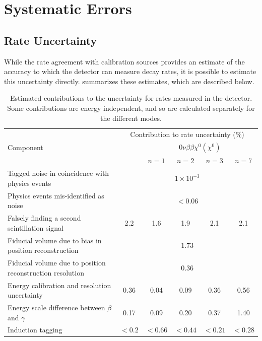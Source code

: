 \documentclass[herrin-thesis.tex]{subfiles}
\begin{document}
\section{Systematic Errors}
\subsection{Rate Uncertainty}
\label{sec:analysis_rate_uncertainty}
While the rate agreement with calibration sources provides an estimate of the accuracy to which the detector can measure decay rates, it is possible to estimate this uncertainty directly.  summarizes these estimates, which are described below.

\begin{table}[tbp]
\centering
\caption[Contributions to systematic uncertainty on rate]{Estimated contributions to the uncertainty for rates measured in the detector. Some contributions are energy independent, and so are calculated separately for the different modes.}
\label{tab:analysis_normalization_uncertainty}
\begin{tabular}{p{} c c c c c}\toprule
			&	\multicolumn{5}{c}{Contribution to rate uncertainty (\%)}				\\
Component	&	\twonu{}	&	\multicolumn{4}{c}{\(0\nu\beta\beta\chi^0(\chi^0)\)}		\\
			&			&	\(n = 1\)	&	\(n = 2\)	&	\(n = 3\)	&	\(n = 7\)	\\
Tagged noise in coincidence with physics events		&	\multicolumn{5}{c}{\(1\times10^{-3}\)}		\\
Physics events mis-identified as noise				&	\multicolumn{5}{c}{\(<0.06\)}				\\
Falsely finding a second scintillation signal			&	2.2	&	1.6	&	1.9	&	2.1	&	2.1	\\
Fiducial volume due to bias in position reconstruction	&	\multicolumn{5}{c}{\(1.73\)}				\\
Fiducial volume due to position reconstruction resolution	&	\multicolumn{5}{c}{\(0.36\)}				\\
Energy calibration and resolution uncertainty			&	0.36	&	0.04	&	0.09	&	0.36	&	0.56	\\
Energy scale difference between \(\beta\) and \(\gamma\)	&	0.17	&	0.09	&	0.20	&	0.37	&	1.40	\\
Induction tagging								&	\(<0.2\)&	\(<0.66\)	&	\(<0.44\)	&	\(<0.21\)	&	\(<0.28\)	\\

\end{tabular}
\end{table}
\end{document}

